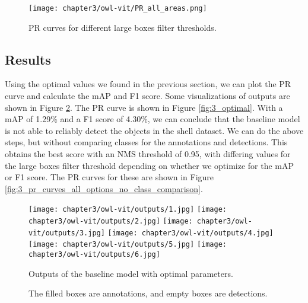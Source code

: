 \begin{figure}[h]
    \centering
    \texttt{[image: chapter3/owl-vit/PR\_all\_areas.png]}
    \caption{PR curves for different large boxes filter thresholds.}
    \label{fig:3_pr_curves_large_boxes}
\end{figure}

\subsection{Results}
Using the optimal values we found in the previous section, we can plot the PR curve and calculate the mAP and F1 score. Some visualizations of outputs are shown in Figure \ref{fig:3_outputs}. The PR curve is shown in Figure \ref{fig:3_optimal}. With a mAP of 1.29\% and a F1 score of 4.30\%, we can conclude that the baseline model is not able to reliably detect the objects in the shell dataset. We can do the above steps, but without comparing classes for the annotations and detections. This obtains the best score with an NMS threshold of 0.95, with differing values for the large boxes filter threshold depending on whether we optimize for the mAP or F1 score. The PR curves for these are shown in Figure \ref{fig:3_pr_curves_all_options_no_class_comparison}.

\begin{figure}[h]
    \begin{adjustwidth}{-1in}{-1in}
        \centering
        \texttt{[image: chapter3/owl-vit/outputs/1.jpg]}
        \texttt{[image: chapter3/owl-vit/outputs/2.jpg]}
        \texttt{[image: chapter3/owl-vit/outputs/3.jpg]}
        \texttt{[image: chapter3/owl-vit/outputs/4.jpg]}
        \texttt{[image: chapter3/owl-vit/outputs/5.jpg]}
        \texttt{[image: chapter3/owl-vit/outputs/6.jpg]}
        \captionsetup{belowskip=-\baselineskip}
    \end{adjustwidth}
    \caption{Outputs of the baseline model with optimal parameters.}
    \setlength\belowcaptionskip{\baselineskip}
    \caption*{The filled boxes are annotations, and empty boxes are detections.}
    \label{fig:3_outputs}
\end{figure}

